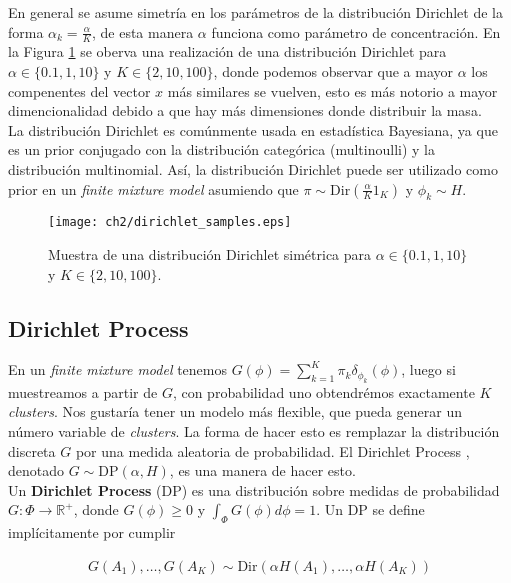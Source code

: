 \documentclass[letterpaper,12pt,oneside]{book} %
\begin{document}
En general se asume simetría en los parámetros de la distribución Dirichlet de la forma $\alpha_{k}=\frac{\alpha}{K}$, de esta manera $\alpha$ funciona como parámetro de concentración. En la Figura \ref{img:dirichlet_samples} se oberva una realización de una distribución Dirichlet para $\alpha \in \{0.1, 1, 10\}$ y $K\in\{2, 10, 100\}$, donde podemos observar que a mayor $\alpha$ los compenentes del vector $x$ más similares se vuelven, esto es más notorio a mayor dimencionalidad debido a que hay más dimensiones donde distribuir la masa.\\

La distribución Dirichlet es comúnmente usada en estadística Bayesiana, ya que es un prior conjugado con la distribución categórica (multinoulli) y la distribución multinomial. Así, la distribución Dirichlet puede ser utilizado como prior en un \textit{finite mixture model} asumiendo que $\pi\sim \text{Dir}(\frac{\alpha}{K}1_{K})$ y $\phi_{k} \sim H$.

\begin{figure}
    \centering
    \texttt{[image: ch2/dirichlet\_samples.eps]}
    \caption{Muestra de una distribución Dirichlet simétrica para $\alpha \in \{0.1, 1, 10\}$ y $K\in\{2, 10, 100\}$.}
    \label{img:dirichlet_samples}
\end{figure}

\subsection{Dirichlet Process}
\label{sec:dp}

En un \textit{finite mixture model} tenemos $G(\phi) = \sum_{k=1}^{K} \pi_{k}\delta_{\phi_{k}}(\phi)$, luego si muestreamos a partir de $G$, con probabilidad uno obtendrémos exactamente $K$ \textit{clusters}. Nos gustaría tener un modelo más flexible, que pueda generar un número variable de \textit{clusters}. La forma de hacer esto es remplazar la distribución discreta $G$ por una medida aleatoria de probabilidad. El Dirichlet Process \citep{ferguson1973bayesian}, denotado $G\sim \text{DP}(\alpha, H)$, es una manera de hacer esto.\\

Un \textbf{Dirichlet Process} (DP) es una distribución sobre medidas de probabilidad $G: \Phi \rightarrow \mathbb{R}^{+}$, donde $G(\phi)\geq 0$ y $\int_{\Phi}G(\phi)d\phi=1$. Un DP se define implícitamente por cumplir 

\begin{align}
    G(A_{1}), \ldots, G(A_{K}) \sim \text{Dir}(\alpha H(A_{1}), \ldots, \alpha H(A_{K}))
\end{align}
\end{document}
